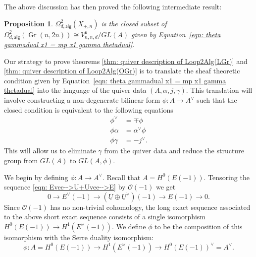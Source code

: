 \message{ !name(Bryan-Vakil.tex)}\documentclass{amsart}
\newtheorem{proposition}[theorem]{Proposition}
\theoremstyle{definition}
\newcommand{\OO}{\mathcal{O}}
\newcommand{\UL}[1]{\underline{#1}}
\newcommand{\alg}{\mathsf{alg}}
\newcommand{\open}{\mathsf{o}}
\newcommand{\Gr}{\operatorname{Gr}}
\newcommand{\LoopTwo}{\Omega^{2}_{d,\alg}}
\newcommand{\Xpm}{X_{\pm,n}}
\begin{document}
The above discussion has then proved the following intermediate result:

\begin{proposition}\label{prop: Loop2(Xpm) is a closed set in
Loop(Gr(n,2n)) satisfying condition involving theta and gamma}
$\LoopTwo (\Xpm )$ is the closed subset of $\LoopTwo (\Gr(n,2n))\cong
V^{\open}_{n,n,d}/GL(A)$ given by Equation~\eqref{eqn: theta gammadual x1
= mp x1 gamma thetadual}. 
\end{proposition}

Our strategy to prove theorems \ref{thm: quiver description of
Loop2Alg(LGr)} and \ref{thm: quiver description of Loop2Alg(OGr)} is
to translate the sheaf theoretic condition given by
Equation~\eqref{eqn: theta gammadual x1 = mp x1 gamma thetadual} into
the language of the quiver data $(A,\alpha ,j,\gamma )$. This
translation will involve constructing a non-degenerate bilinear form
$\phi :A\to A^{\vee}$ such that the closed condition is equivalent to
the following equations
\begin{align}\label{eqns: closed conditions}
\phi^{\vee}&= \mp \phi \nonumber \\ 
\phi \alpha &=\alpha^{\vee}\phi \\
\phi \gamma &= - j^{\vee}. \nonumber 
\end{align}
This will allow us to eliminate $\gamma$ from the quiver data and
reduce the structure group from $GL(A)$ to $GL(A,\phi )$.

We begin by defining $\phi :A\to A^{\vee}$. Recall that $A =
H^{0}(E(-1))$. Tensoring the sequence \eqref{eqn:
Evee-->U+Uvee-->E} by $\OO (-1)$ we get
\[
0\to E^{\vee}(-1)\to (\UL{U}\oplus \UL{U}^{\vee})(-1)\to E(-1)\to 0.
\]
Since $\OO (-1)$ has no non-trivial cohomology, the long exact
sequence associated to the above short exact sequence consists of a
single isomorphism $H^{0}(E(-1))\to H^{1}(E^{\vee}(-1))$. We define
$\phi$ to be the composition of this isomorphism with the Serre
duality isomorphism: 
\[
\phi : A = H^{0}(E(-1))\to H^{1}(E^{\vee}(-1)) \to H^{0}(E(-1))^{\vee}=A^{\vee}.
\]
\end{document}
